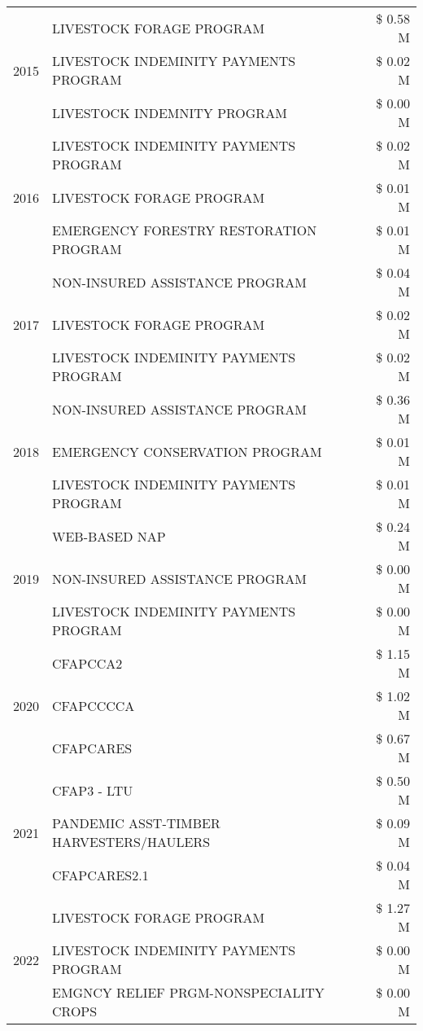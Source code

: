 \begin{tabular}{llr}
\cline{1-3}
\multirow[t]{3}{*}{2015} & LIVESTOCK FORAGE PROGRAM & \$ 0.58 M \\
 & LIVESTOCK INDEMINITY PAYMENTS PROGRAM & \$ 0.02 M \\
 & LIVESTOCK INDEMNITY PROGRAM & \$ 0.00 M \\
\cline{1-3}
\multirow[t]{3}{*}{2016} & LIVESTOCK INDEMINITY PAYMENTS PROGRAM & \$ 0.02 M \\
 & LIVESTOCK FORAGE PROGRAM & \$ 0.01 M \\
 & EMERGENCY FORESTRY RESTORATION PROGRAM & \$ 0.01 M \\
\cline{1-3}
\multirow[t]{3}{*}{2017} & NON-INSURED ASSISTANCE PROGRAM & \$ 0.04 M \\
 & LIVESTOCK FORAGE PROGRAM & \$ 0.02 M \\
 & LIVESTOCK INDEMINITY PAYMENTS PROGRAM & \$ 0.02 M \\
\cline{1-3}
\multirow[t]{3}{*}{2018} & NON-INSURED ASSISTANCE PROGRAM & \$ 0.36 M \\
 & EMERGENCY CONSERVATION PROGRAM & \$ 0.01 M \\
 & LIVESTOCK INDEMINITY PAYMENTS PROGRAM & \$ 0.01 M \\
\cline{1-3}
\multirow[t]{3}{*}{2019} & WEB-BASED NAP & \$ 0.24 M \\
 & NON-INSURED ASSISTANCE PROGRAM & \$ 0.00 M \\
 & LIVESTOCK INDEMINITY PAYMENTS PROGRAM & \$ 0.00 M \\
\cline{1-3}
\multirow[t]{3}{*}{2020} & CFAPCCA2 & \$ 1.15 M \\
 & CFAPCCCCA & \$ 1.02 M \\
 & CFAPCARES & \$ 0.67 M \\
\cline{1-3}
\multirow[t]{3}{*}{2021} & CFAP3 - LTU & \$ 0.50 M \\
 & PANDEMIC ASST-TIMBER HARVESTERS/HAULERS & \$ 0.09 M \\
 & CFAPCARES2.1 & \$ 0.04 M \\
\cline{1-3}
\multirow[t]{3}{*}{2022} & LIVESTOCK FORAGE PROGRAM & \$ 1.27 M \\
 & LIVESTOCK INDEMINITY PAYMENTS PROGRAM & \$ 0.00 M \\
 & EMGNCY RELIEF PRGM-NONSPECIALITY CROPS & \$ 0.00 M \\
\cline{1-3}
\bottomrule
\end{tabular}
